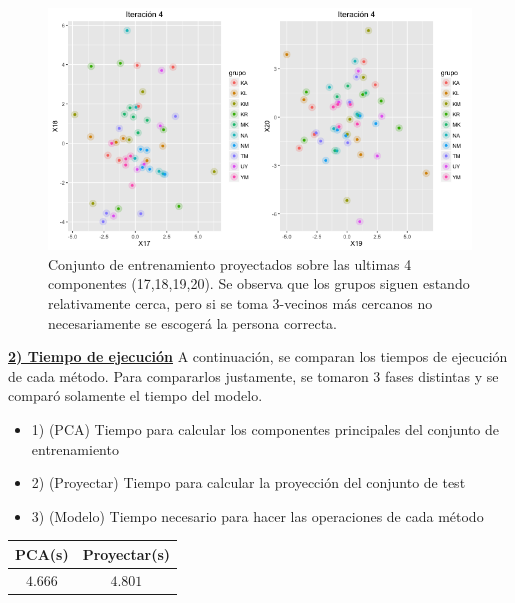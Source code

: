 \begin{figure}[!ht]
  \centering
  \includegraphics[width=.95\textwidth]{Figures/Chapter4_ultimasComponentes_JAF.png} 
  \caption[Individuos proyectados (JAFFE)]
  {Conjunto de entrenamiento proyectados sobre las ultimas 4 componentes (17,18,19,20). Se observa que los grupos siguen estando relativamente cerca, pero si se toma 3-vecinos más cercanos no necesariamente se escogerá la persona correcta.}
\end{figure}


\underline{\textbf{2) Tiempo de ejecución}}
A continuación, se comparan los tiempos de ejecución de cada método. Para compararlos justamente, se tomaron 3 fases distintas y se comparó solamente el tiempo del modelo.

\begin{itemize}
\item 1) (PCA) Tiempo para calcular los componentes principales del conjunto de entrenamiento
\item 2) (Proyectar) Tiempo para calcular la proyección del conjunto de test
\item 3) (Modelo) Tiempo necesario para hacer las operaciones de cada método

\end{itemize}

\begin{center}
\begin{tabular}{ | c | c |} 
\hline
 PCA(s) & Proyectar(s) \\ 
\hline
\hline
$4.666$ & $4.801$ \\ 
\hline
\hline
\end{tabular}
\end{center}


